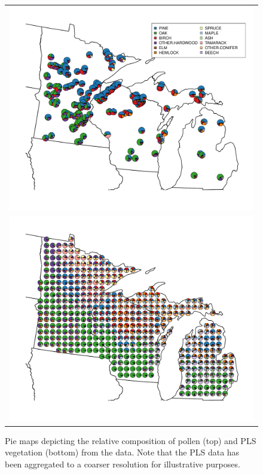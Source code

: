 

\begin{figure}
\centering
\begin{tabular}{c}
\includegraphics[width=5in]{figures/pie_plot_pollen_ALL_v0_3.pdf} \\
\includegraphics[width=5in]{figures/pie_plot_pls_ALL_v0_3.pdf}
\end{tabular}
\caption{Pie maps depicting the relative composition of pollen (top)
  and PLS vegetation (bottom) from the data. Note that the PLS data
  has been aggregated to a coarser resolution for illustrative
  purposes.}
\label{fig:pie}
\end{figure}

